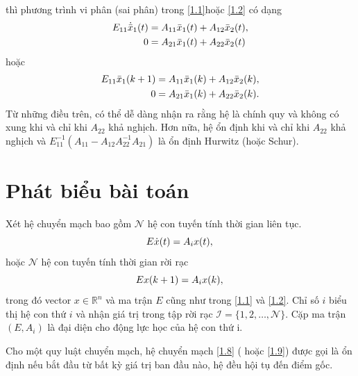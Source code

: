 \documentclass[12pt,a4paper]{report}
\theoremstyle{definition}
\theoremstyle{definition}
\numberwithin{dl}{chapter}
\numberwithin{vd}{chapter}
\numberwithin{corollary}{chapter}
\numberwithin{lemma}{chapter}
\numberwithin{md}{chapter}
\numberwithin{dn}{chapter}
\numberwithin{cy}{chapter}
\numberwithin{nx}{chapter}
\begin{document}
thì phương trình vi phân (sai phân) trong  \eqref{1.1}hoặc \eqref{1.2} có dạng
\begin{equation}\label{1.6}
\begin{aligned}
E_{11} \dot{\bar{x}}_{1}(t) &=A_{11} \bar{x}_{1}(t)+A_{12} \bar{x}_{2}(t), \\
0 &=A_{21} \bar{x}_{1}(t)+A_{22} \bar{x}_{2}(t)
\end{aligned} \\
\end{equation}
hoặc
\begin{equation}\label{1.7}
\begin{aligned}
E_{11} \bar{x}_{1}(k+1) &=A_{11} \bar{x}_{1}(k)+A_{12} \bar{x}_{2}(k), \\
0 &=A_{21} \bar{x}_{1}(k)+A_{22} \bar{x}_{2}(k).
\end{aligned} \\
\end{equation}
Từ những điều trên, có thể dễ dàng nhận ra rằng hệ là chính quy và không có xung khi và chỉ khi $A_{22}$ khả nghịch. Hơn nữa, hệ ổn định khi và chỉ khi $A_{22}$ khả nghịch và  $E_{11}^{-1}\left(A_{11}-A_{12} A_{22}^{-1} A_{21}\right)$ là ổn định Hurwitz (hoặc Schur).


\section{Phát biểu bài toán}\label{Section 1.3}

Xét hệ chuyển mạch bao gồm $\mathcal{N}$ hệ con tuyến tính thời gian liên tục. 
\begin{equation}\label{1.8}
E \dot{x}(t)=A_{i} x(t), \\
\end{equation}
hoặc $\mathcal{N}$ hệ con tuyến tính thời gian rời rạc
\begin{equation}\label{1.9}
E x(k+1)=A_{i} x(k), \\
\end{equation}
trong đó vector $x \in \mathbb{R}^{n}$ và ma trận  $E$ cũng như trong \eqref{1.1} và \eqref{1.2}. Chỉ số $i$ biểu thị hệ con thứ $i$ và nhận giá trị trong tập rời rạc $\mathcal{I}=\{1,2, \ldots, \mathcal{N}\}$. Cặp ma trận $(E,A_{i})$ là đại diện cho động lực học của hệ con thứ i.

Cho một quy luật chuyển mạch, hệ chuyển mạch \eqref{1.8} ( hoặc \eqref{1.9}) được gọi là ổn định nếu bắt đầu từ bất kỳ giá trị ban đầu nào, hệ đều hội tụ đến điểm gốc.
\end{document}
